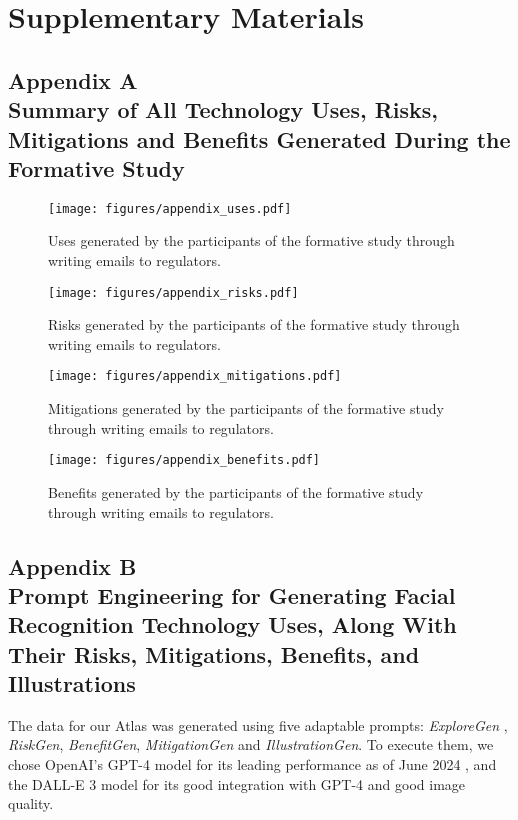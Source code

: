 \clearpage
\onecolumn
\section{Supplementary Materials}

\subsection{Appendix A \\Summary of All Technology Uses, Risks, Mitigations and Benefits Generated During the Formative Study}

\begin{figure*}[h!]
  \centering
  \texttt{[image: figures/appendix\_uses.pdf]}
  \caption{Uses generated by the participants of the formative study through writing emails to regulators.}
  \label{fig:uses}
\end{figure*}

\begin{figure*}[h!]
  \centering
  \texttt{[image: figures/appendix\_risks.pdf]}
  \caption{Risks generated by the participants of the formative study through writing emails to regulators.}
  \label{fig:risks}
\end{figure*}

\begin{figure*}[h!]
  \centering
  \texttt{[image: figures/appendix\_mitigations.pdf]}
  \caption{Mitigations generated by the participants of the formative study through writing emails to regulators.}
  \label{fig:mitigations}
\end{figure*}

\begin{figure*}[h!]
  \centering
  \texttt{[image: figures/appendix\_benefits.pdf]}
  \caption{Benefits generated by the participants of the formative study through writing emails to regulators.}
  \label{fig:benefits}
\end{figure*}

\clearpage
\subsection{Appendix B \\Prompt Engineering for Generating Facial Recognition Technology Uses, Along With Their Risks, Mitigations, Benefits, and Illustrations}
The data for our Atlas was generated using five adaptable prompts: \emph{ExploreGen} \cite{herdel2024exploregen}, \emph{RiskGen}, \emph{BenefitGen}, \emph{MitigationGen} \cite{constantinides2024_risks_benefits, AIDesign2024} and \emph{IllustrationGen}. To execute them, we chose OpenAI's GPT-4 model for its leading performance as of June 2024 \cite{leaderboard}, and the DALL-E 3 model for its good integration with GPT-4 and good image quality. 

